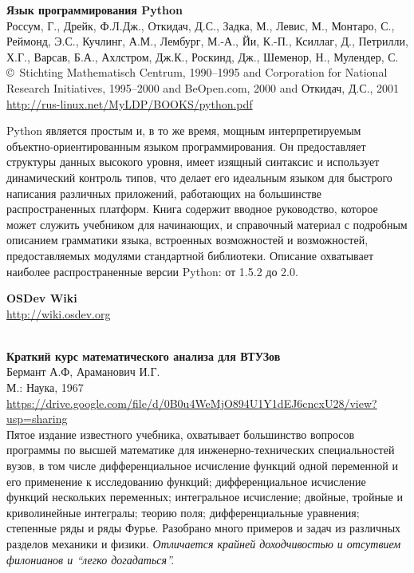 \begin{thebibliography}{99}

\textbf{Язык программирования Python}\\
Россум, Г., Дрейк, Ф.Л.Дж., Откидач, Д.С., Задка, М.,  Левис, М.,  Монтаро, С.,
Реймонд, Э.С., Кучлинг, А.М.,  Лембург, М.-А.,  Йи, К.-П.,  Ксиллаг, Д.,
Петрилли, Х.Г., Варсав, Б.А.,  Ахлстром, Дж.К.,  Роскинд, Дж.,  Шеменор, Н.,
Мулендер, С.\\
\copyright\ Stichting Mathematisch Centrum, 1990–1995
and Corporation for National Research Initiatives, 1995–2000
and BeOpen.com, 2000
and Откидач, Д.С., 2001 \\
\url{http://rus-linux.net/MyLDP/BOOKS/python.pdf}

Python является простым и, в то же время, мощным интерпретируемым
объектно-ориентированным языком программирования. Он предоставляет структуры
данных высокого уровня, имеет изящный синтаксис и использует динамический
контроль типов, что делает его идеальным языком для быстрого написания различных
приложений, работающих на большинстве распространенных платформ. Книга содержит
вводное руководство, которое может служить учебником для начинающих, и
справочный материал с подробным описанием грамматики языка, встроенных
возможностей и возможностей, предоставляемых модулями стандартной библиотеки.
Описание охватывает наиболее распространенные версии Python: от 1.5.2 до 2.0.


 \textbf{OSDev Wiki}\\
\url{http://wiki.osdev.org}



 \\
\textbf{Краткий курс математического анализа для ВТУЗов}\\
Бермант А.Ф, Араманович И.Г.\\
М.: Наука, 1967\\
\url{https://drive.google.com/file/d/0B0u4WeMjO894U1Y1dEJ6cncxU28/view?usp=sharing}\\

Пятое издание известного учебника, охватывает большинство вопросов программы по
высшей математике для инженерно-технических специальностей вузов, в том числе
дифференциальное исчисление функций одной переменной и его применение к
исследованию функций; дифференциальное исчисление функций нескольких переменных;
интегральное исчисление; двойные, тройные и криволинейные интегралы; теорию
поля; дифференциальные уравнения; степенные ряды и ряды Фурье. Разобрано много
примеров и задач из различных разделов механики и физики. \emph{Отличается
крайней доходчивостью и отсутвием филонианов и ``легко догадаться''.}


\end{thebibliography}
